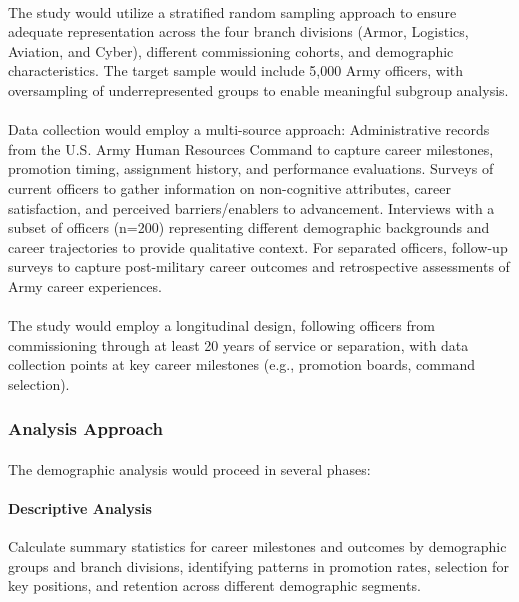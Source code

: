\documentclass[../main.tex]{subfiles}
\begin{document}
\paragraph{} The study would utilize a stratified random sampling approach to ensure adequate representation across the four branch divisions (Armor, Logistics, Aviation, and Cyber), different commissioning cohorts, and demographic characteristics. The target sample would include 5,000 Army officers, with oversampling of underrepresented groups to enable meaningful subgroup analysis.

\paragraph{} Data collection would employ a multi-source approach: Administrative records from the U.S. Army Human Resources Command to capture career milestones, promotion timing, assignment history, and performance evaluations. Surveys of current officers to gather information on non-cognitive attributes, career satisfaction, and perceived barriers/enablers to advancement. Interviews with a subset of officers (n=200) representing different demographic backgrounds and career trajectories to provide qualitative context. For separated officers, follow-up surveys to capture post-military career outcomes and retrospective assessments of Army career experiences.

\paragraph{} The study would employ a longitudinal design, following officers from commissioning through at least 20 years of service or separation, with data collection points at key career milestones (e.g., promotion boards, command selection).

\subsubsection{Analysis Approach}

\paragraph{} The demographic analysis would proceed in several phases:

\paragraph{Descriptive Analysis} Calculate summary statistics for career milestones and outcomes by demographic groups and branch divisions, identifying patterns in promotion rates, selection for key positions, and retention across different demographic segments.
\end{document}
